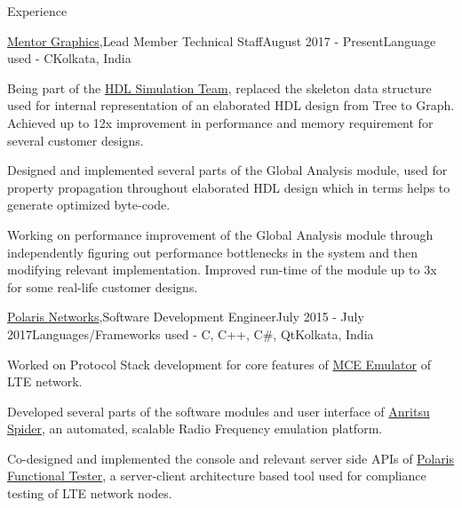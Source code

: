 \documentclass{resume}
\begin{document}

\begin{rSection}{Experience}

\begin{rSubsection}{\href{https://mentor.com}{Mentor Graphics},}{Lead Member Technical Staff}{August 2017 - Present}{Language used - C}{Kolkata, India}
\item Being part of the \href{https://eda.sw.siemens.com/en-US/ic/questa/simulation/}{HDL Simulation Team}, replaced the skeleton data structure used for internal representation of an elaborated HDL design from Tree to Graph. Achieved up to 12x improvement in performance and memory requirement for several customer designs.
\item Designed and implemented several parts of the Global Analysis module, used for property propagation throughout elaborated HDL design which in terms helps to generate optimized byte-code.
\item Working on performance improvement of the Global Analysis module through independently figuring out performance bottlenecks in the system and then modifying relevant implementation. Improved run-time of the module up to 3x for some real-life customer designs.
\end{rSubsection}

\begin{rSubsection}{\href{http://www.polarisnetworks.net/}{Polaris Networks},}{Software Development Engineer}{July 2015 - July 2017}{Languages/Frameworks used - C, C++, C\#, Qt}{Kolkata, India}
\item Worked on Protocol Stack development for core features of \href{https://polarisnetworks.net/lte_emulators.html}{MCE Emulator} of LTE network.
\item Developed several parts of the software modules and user interface of \href{https://www.anritsu.com/en-us/test-measurement/products/spider}{Anritsu Spider}, an automated, scalable Radio Frequency emulation platform.
\item Co-designed and implemented the console and relevant server side APIs of \href{https://polarisnetworks.net/functional-testers.html}{Polaris Functional Tester}, a server-client architecture based tool used for compliance testing of LTE network nodes.
\end{rSubsection}

\end{rSection}
\end{document}
